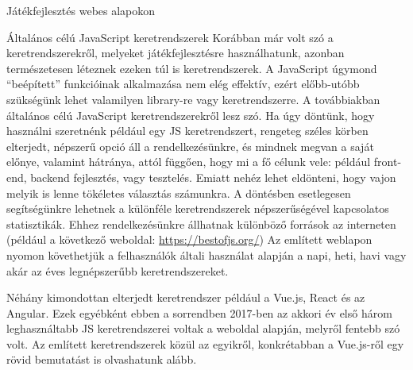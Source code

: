 \begin{MyChapter}{Játékfejlesztés webes alapokon}
	\begin{MySection}{Általános célú JavaScript keretrendszerek}
		Korábban már volt szó a keretrendszerekről, melyeket játékfejlesztésre használhatunk, azonban természetesen léteznek ezeken túl is keretrendszerek. A JavaScript úgymond ``beépített'' funkcióinak alkalmazása nem elég effektív, ezért előbb-utóbb szükségünk lehet valamilyen library-re vagy keretrendszerre. A továbbiakban általános célú JavaScript keretrendszerekről lesz szó.
		Ha úgy döntünk, hogy használni szeretnénk például egy JS keretrendszert, rengeteg széles körben elterjedt, népszerű opció áll a rendelkezésünkre, és mindnek megvan a saját előnye, valamint hátránya, attól függően, hogy mi a fő célunk vele: például front-end, backend fejlesztés, vagy tesztelés. Emiatt nehéz lehet eldönteni, hogy vajon melyik is lenne tökéletes választás számunkra. A döntésben esetlegesen segítségünkre lehetnek a különféle keretrendszerek népszerűségével kapcsolatos statisztikák. Ehhez rendelkezésünkre állhatnak különböző források az interneten (például a következő weboldal: \url{https://bestofjs.org/})
		Az említett weblapon nyomon követhetjük a felhasználók általi használat alapján a napi, heti, havi vagy akár az éves legnépszerűbb keretrendszereket.
		\cite{best_js_framework}
		
		Néhány kimondottan elterjedt keretrendszer például a Vue.js, React és az Angular. Ezek egyébként ebben a sorrendben 2017-ben az akkori év első három leghasználtabb JS keretrendszerei voltak a weboldal alapján, melyről fentebb szó volt.
		Az említett keretrendszerek közül az egyikről, konkrétabban a Vue.js-ről egy rövid bemutatást is olvashatunk alább.
		

\end{MySection}
\end{MyChapter}
